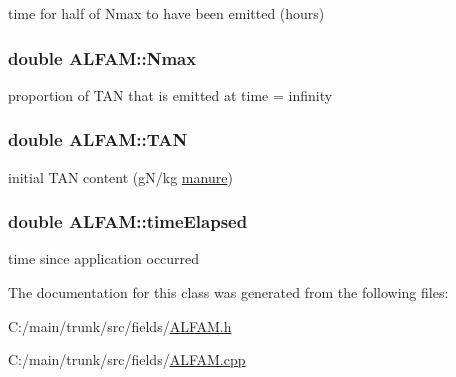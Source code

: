 time for half of Nmax to have been emitted (hours) \hypertarget{class_a_l_f_a_m_a030ebc40137f179126b288109c88a01e}{
\subsubsection[{Nmax}]{\setlength{\rightskip}{0pt plus 5cm}double {\bf ALFAM::Nmax}}}
\label{class_a_l_f_a_m_a030ebc40137f179126b288109c88a01e}


proportion of TAN that is emitted at time = infinity \hypertarget{class_a_l_f_a_m_acc5733b478c6b2ff521d5a6c6de62093}{
\subsubsection[{TAN}]{\setlength{\rightskip}{0pt plus 5cm}double {\bf ALFAM::TAN}}}
\label{class_a_l_f_a_m_acc5733b478c6b2ff521d5a6c6de62093}


initial TAN content (gN/kg \hyperlink{classmanure}{manure}) \hypertarget{class_a_l_f_a_m_a533d0dbe340ecc6aebb7b2ff33a21cd4}{
\subsubsection[{timeElapsed}]{\setlength{\rightskip}{0pt plus 5cm}double {\bf ALFAM::timeElapsed}}}
\label{class_a_l_f_a_m_a533d0dbe340ecc6aebb7b2ff33a21cd4}


time since application occurred 

The documentation for this class was generated from the following files:\begin{DoxyCompactItemize}
\item 
C:/main/trunk/src/fields/\hyperlink{_a_l_f_a_m_8h}{ALFAM.h}\item 
C:/main/trunk/src/fields/\hyperlink{_a_l_f_a_m_8cpp}{ALFAM.cpp}\end{DoxyCompactItemize}
